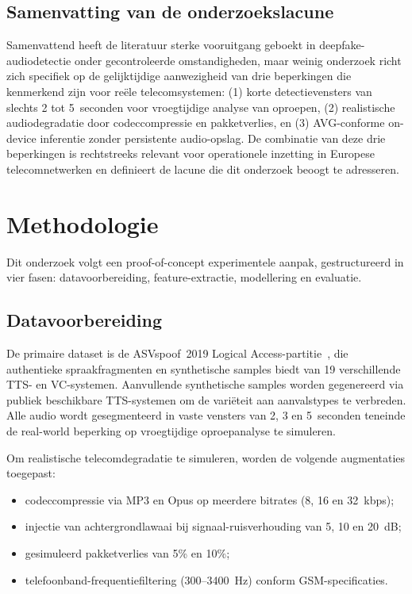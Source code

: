 \documentclass{hogent-article}
\begin{document}
\subsection{Samenvatting van de onderzoekslacune}

Samenvattend heeft de literatuur sterke vooruitgang geboekt in deepfake-audio\-detectie
onder gecontroleerde omstandigheden, maar weinig onderzoek richt zich specifiek
op de gelijktijdige aanwezigheid van drie beperkingen die kenmerkend zijn voor
reële telecomsystemen: (1) korte detectievensters van slechts 2 tot 5~seconden
voor vroegtijdige analyse van oproepen, (2) realistische audiodegradatie door
codeccompressie en pakketverlies, en (3) AVG-conforme on-device inferentie zonder
persistente audio-opslag. De combinatie van deze drie beperkingen is rechtstreeks
relevant voor operationele inzetting in Europese telecomnetwerken en definieert
de lacune die dit onderzoek beoogt te adresseren.

\section{Methodologie}%
\label{sec:methodologie}

Dit onderzoek volgt een proof-of-concept experimentele aanpak, gestructureerd
in vier fasen: datavoorbereiding, feature-extractie, modellering en evaluatie.

\subsection{Datavoorbereiding}

De primaire dataset is de ASVspoof~2019 Logical Access-partitie~\autocite{Wang2020},
die authentieke spraakfragmenten en synthetische samples biedt van 19
verschillende TTS- en VC-systemen. Aanvullende synthetische samples worden
gegenereerd via publiek beschikbare TTS-systemen om de variëteit aan aanvalstypes
te verbreden. Alle audio wordt gesegmenteerd in vaste vensters van 2, 3 en 5~seconden
teneinde de real-world beperking op vroegtijdige oproepanalyse te simuleren.

Om realistische telecomdegradatie te simuleren, worden de volgende augmentaties
toegepast:

\begin{itemize}
  \item codeccompressie via MP3 en Opus op meerdere bitrates (8, 16 en 32~kbps);
  \item injectie van achtergrondlawaai bij signaal-ruisverhouding van 5, 10
    en 20~dB;
  \item gesimuleerd pakketverlies van 5\% en 10\%;
  \item telefoonband-frequentiefiltering (300--3400~Hz) conform GSM-specificaties.
\end{itemize}
\end{document}

